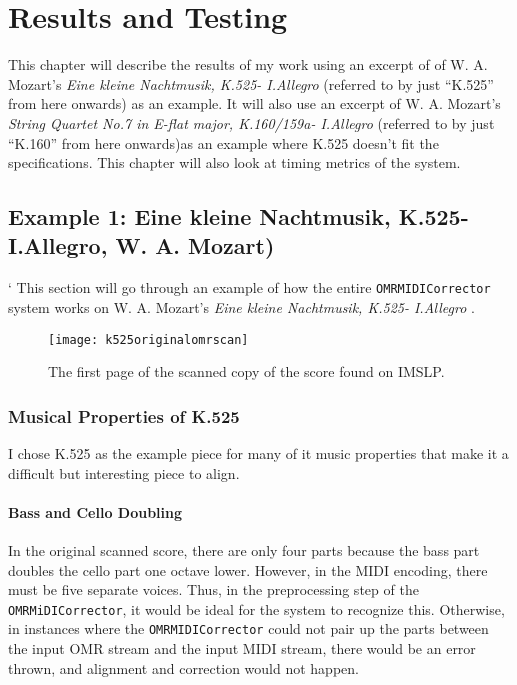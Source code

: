 \chapter{Results and Testing}
This chapter will describe the results of my work using an excerpt of of W. A. Mozart's \textit{Eine kleine Nachtmusik, K.525- I.Allegro} (referred to by just ``K.525'' from here onwards) as an example. It will also use an excerpt of W. A. Mozart's \textit{String Quartet No.7 in E-flat major, K.160/159a- I.Allegro} (referred to by just ``K.160'' from here onwards)as an example where K.525 doesn't fit the specifications. This chapter will also look at timing metrics of the system.

\section{Example 1: Eine kleine Nachtmusik, K.525- I.Allegro, W. A. Mozart)}		`
This section will go through an example of how the entire \texttt{OMRMIDICorrector} system works on W. A. Mozart's \textit{Eine kleine Nachtmusik, K.525- I.Allegro }.

\begin{figure}[H]
\centering
\texttt{[image: k525originalomrscan]}
\caption{The first page of the scanned copy of the score found on IMSLP.}
\end{figure}

\subsection{Musical Properties of K.525}
I chose K.525 as the example piece for many of it music properties that make it a difficult but interesting piece to align. 

\subsubsection{Bass and Cello Doubling}
In the original scanned score, there are only four parts because the bass part doubles the cello part one octave lower. However, in the MIDI encoding, there must be five separate voices. Thus, in the preprocessing step of the \texttt{OMRMiDICorrector}, it would be ideal for the system to recognize this. Otherwise, in instances where the \texttt{OMRMIDICorrector} could not pair up the parts between the input OMR stream and the input MIDI stream, there would be an error thrown, and alignment and correction would not happen. 


